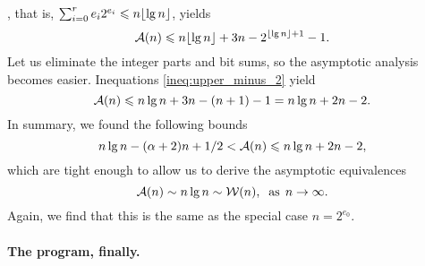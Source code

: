 , that is, \(\sum_{i=0}^{r}{e_i2^{e_i}}
\leqslant n\lfloor{\lg n}\rfloor\), yields
\begin{equation}
\mathcal{A}(n) \leqslant n\lfloor{\lg n}\rfloor + 3n - 2^{\lfloor{\lg n}\rfloor+1} - 1.
\label{ineq:A_upper}
\end{equation}
Let us eliminate the integer parts and bit sums, so the asymptotic
analysis becomes easier. Inequations \eqref{ineq:upper_minus_2}
 yield
\[
\mathcal{A}(n) \leqslant n\lg n + 3n - (n + 1) - 1 = n\lg n + 2n - 2.
\]
In summary, we found the following bounds
\begin{equation*}
n \lg n - (\alpha+2)n + 1/2 < \mathcal{A}(n) \leqslant n\lg n + 2n - 2,
\end{equation*}
which are tight enough to allow us to derive the asymptotic
equivalences
\[
\mathcal{A}(n) \mathrel{\sim} n \lg n \mathrel{\sim}
\mathcal{W}(n),\;\; \text{as} \,\; n \rightarrow \infty.
\]
Again, we find that this is the same as the special case
\(n=2^{e_0}\).

\medskip

\paragraph{The program, finally.}

